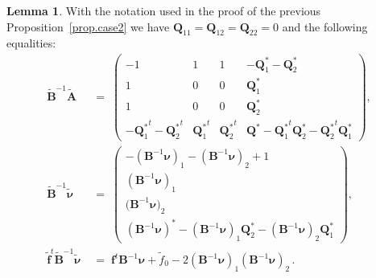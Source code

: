 \documentclass[12pt,reqno]{amsart}
\theoremstyle{definition}
\newtheorem{lemma}[theorem]{Lemma}
\def\mbfQ{\mathbf Q}
\renewcommand{\=}{\;=\;}
\begin{document}
\begin{lemma}
\label{lem.23.c2}
With the notation used in the proof of the previous Proposition~\ref{prop.case2}
we have $\mbfQ_{11} = \mbfQ_{12} =\mbfQ_{22} = 0$ and
the following equalities: 
\begin{align}
\label{eq.c3.bia}
 \widetilde {\mathbf B}^{-1} \widetilde {\mathbf A} &\=
 \left(\!\!\begin{array}{ccc|c}
-1 & 1 & 1 & -\mbfQ_1^*-\mbfQ_2^*\\
1 & 0 & 0 & \mbfQ_1^*\\
1 & 0 & 0 & \mbfQ_2^*\\
\hline
-{\mbfQ_1^*}^t-{\mbfQ_2^*}^t & {\mbfQ_1^*}^t& {\mbfQ_2^*}^t &
\mbfQ^*-{\mbfQ_1^*}^t{\mbfQ_2^*}-{\mbfQ_2^*}^t{\mbfQ_1^*}
 \end{array}\!\!\right),\\\label{eq.c3.binu}
 \widetilde {\mathbf B}^{-1} \widetilde {\boldsymbol{\nu}} &\=
 \left(\!\!\begin{array}{c}
 -({\mathbf B}^{-1}\boldsymbol{\nu})_1
 -({\mathbf B}^{-1}\boldsymbol{\nu})_2+1\\
 ({\mathbf B}^{-1}\boldsymbol{\nu})_1\\
 {(\mathbf B}^{-1}\boldsymbol{\nu})_2\\
 ({\mathbf B}^{-1}\boldsymbol{\nu})^*
 -({\mathbf B}^{-1}\boldsymbol{\nu})_1\mbfQ_2^*
 -({\mathbf B}^{-1}\boldsymbol{\nu})_2\mbfQ_1^*
 \end{array}\!\!\right),\\\label{eq.c3.ff2}
\widetilde{\mathbf{f}}^{t}\widetilde {\mathbf B}^{-1}\widetilde{\boldsymbol{\nu}}
&\= \mathbf{f}^{t}\mathbf{B}^{-1}\boldsymbol{\nu}+\widetilde{f}_0-2
({\mathbf B}^{-1}\boldsymbol{\nu})_1({\mathbf B}^{-1}\boldsymbol{\nu})_2\,.
\end{align}
\end{lemma}
\end{document}
